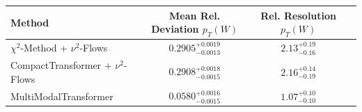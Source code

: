     \begin{tabular}{lccc}
        \toprule
        Method & Mean Rel. Deviation $p_{T}(W)$ & Rel. Resolution $p_{T}(W)$ \\
        \midrule
        $\chi^2$-Method + $\nu^2$-Flows & $0.2905^{+0.0019}_{-0.0013}$ & $2.13^{+0.19}_{-0.16}$ \\
        CompactTransformer + $\nu^2$-Flows & $0.2908^{+0.0018}_{-0.0015}$ & $2.16^{+0.14}_{-0.19}$ \\
        MultiModalTransformer & $0.0580^{+0.0016}_{-0.0015}$ & $1.07^{+0.10}_{-0.10}$ \\
        \bottomrule
    \end{tabular}